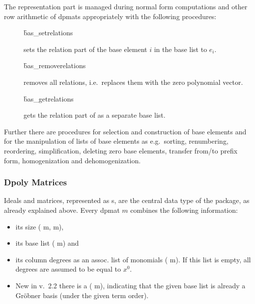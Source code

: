 The representation part is managed during normal form computations
and other row arithmetic of dpmats appropriately with the following
procedures:
\begin{description}
\item[]
  \begin{syntax}
    \f{bas\_setrelations} 
  \end{syntax}
  \hypertarget{procedure:BAS_SETRELATIONS}{}
sets the relation part of the base element $i$ in the base list
 to $e_i$.

\item[]
  \begin{syntax}
    \f{bas\_removerelations} 
  \end{syntax}
  \hypertarget{procedure:BAS_REMOVERELATIONS}{}
removes all relations, i.e.\ replaces them with the zero
polynomial vector.

\item[]
  \begin{syntax}
    \f{bas\_getrelations} 
  \end{syntax}
  \hypertarget{procedure:BAS_GETRELATIONS}{}
gets the relation part of  as a separate base list.
\end{description}

Further there are procedures for selection and construction of base
elements and for the manipulation of lists of base elements as e.g.\
sorting, renumbering, reordering, simplification, deleting zero base
elements, transfer from/to prefix form, homogenization and dehomogenization.

\subsubsection{Dpoly Matrices}

Ideals and matrices, represented as s, are the central
data type of the \package{CALI} package, as already explained above. Every
dpmat $m$ combines the following information:
\begin{itemize}
\item its size ( m, m),

\item its base list ( m) and

\item its column degrees as an assoc. list of monomials
( m). If this list is empty, all degrees are
assumed to be equal to $x^0$.

\item New in v.~2.2 there is a  ( m),
indicating that the given base list is already a Gr\"obner basis (under the
given term order).
\end{itemize}

